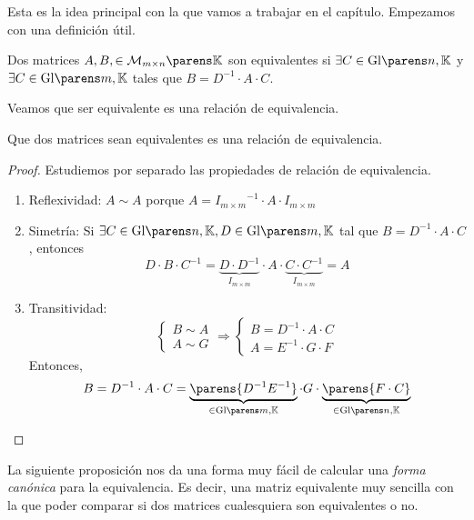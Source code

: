 \documentclass[../algebra_lineal.tex]{subfiles}
\begin{document}
Esta es la idea principal con la que vamos a trabajar en el capítulo. Empezamos con una definición útil.

\begin{definition}
    Dos matrices $A, B, \in \mgk{m}{n}$ son equivalentes si $\exists C \in \glk{n}$ y $\exists C \in \glk{m}$ tales que $B=D^{-1} \cdot A \cdot C$.
\end{definition}

Veamos que ser equivalente es una relación de equivalencia.

\begin{proposition}
    Que dos matrices sean equivalentes es una relación de equivalencia.
\end{proposition}

\begin{proof}
    Estudiemos por separado las propiedades de relación de equivalencia.
    \begin{enumerate}
        \item Reflexividad: $A \sim A$ porque $A = {I_{m \times m}}^{-1} \cdot A \cdot I_{m \times m}$
        \item Simetría: Si $\exists C \in \glk{n}, D \in \glk{m}$ tal que $B=D^{-1}\cdot A \cdot C$, entonces
            \[
                D \cdot B \cdot C^{-1} = \underbrace{D \cdot D^{-1}}_{I_{m \times m}} \cdot A \cdot \underbrace{C \cdot C^{-1}}_{I_{m \times m}} = A
            \]
        \item Transitividad:
        \[
            \begin{cases}
                B \sim A \\
                A \sim G 
            \end{cases}  \Rightarrow
            \begin{cases}
                B = D^{-1} \cdot A \cdot C \\
                A = E^{-1} \cdot G \cdot F
            \end{cases}
        \]
        Entonces,
        \[
            B = D^{-1} \cdot A \cdot C = \underbrace{\parens{D^{-1} E^{-1}}}_{\in \glk{m}} \cdot G \cdot \underbrace{ \parens{F \cdot C} }_{\in \glk{n}} 
        \]
    \end{enumerate}
\end{proof}
La siguiente proposición nos da una forma muy fácil de calcular una \textit{forma canónica} para la equivalencia. Es decir, una matriz equivalente muy sencilla con la que poder comparar si dos matrices cualesquiera son equivalentes o no.
\end{document}
